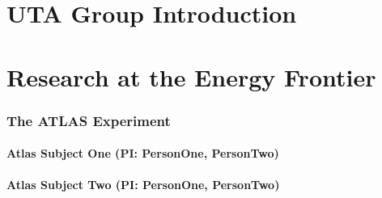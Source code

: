 \documentclass[11pt]{article}
\def\onehead#1{\part{#1}}
\def\twohead#1{\section{#1}}
\def\threehead#1{\subsection{#1}}
\begin{document}
\pagestyle{empty}
\baselineskip=23pt
\normalsize

\noindent



\newpage



\newpage

\newpage
\pagestyle{plain}
\setcounter{page}{1}


\onehead{UTA Group Introduction}


\newpage


\onehead{Research at the Energy Frontier}














\twohead{The ATLAS Experiment}


\threehead{Atlas Subject One (PI: PersonOne, PersonTwo)}
%

\threehead{Atlas Subject Two (PI: PersonOne, PersonTwo)}
%
\end{document}
